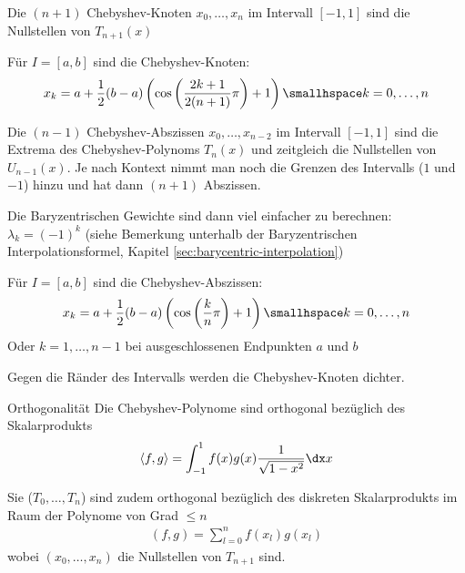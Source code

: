 Die $(n + 1)$ Chebyshev-Knoten $x_0, \ldots, x_n$ im Intervall $[-1, 1]$ sind die Nullstellen von $T_{n + 1}(x)$

 Für $I = [a, b]$ sind die Chebyshev-Knoten:
\rmvspace
\begin{align*}
	x_k = a + \frac{1}{2} (b - a) \left( \cos \left( \frac{2k + 1}{2(n + 1)} \pi \right) + 1 \right) \smallhspace k = 0, \ldots, n
\end{align*}

 Die $(n - 1)$ Chebyshev-Abszissen $x_0, \ldots, x_{n - 2}$ im Intervall $[-1, 1]$ sind die Extrema des Chebyshev-Polynoms $T_n(x)$ und zeitgleich die Nullstellen von $U_{n - 1}(x)$.
Je nach Kontext nimmt man noch die Grenzen des Intervalls ($1$ und $-1$) hinzu und hat dann $(n + 1)$ Abszissen.

Die Baryzentrischen Gewichte sind dann viel einfacher zu berechnen: $\lambda_k = (-1)^k$ (siehe Bemerkung unterhalb der Baryzentrischen Interpolationsformel, Kapitel \ref{sec:barycentric-interpolation})

 Für $I = [a, b]$ sind die Chebyshev-Abszissen:
\rmvspace
\begin{align*}
	x_k = a + \frac{1}{2} (b - a) \left( \cos \left( \frac{k}{n} \pi \right) + 1 \right) \smallhspace k = 0, \ldots, n
\end{align*}
Oder $k = 1, \ldots, n - 1$ bei ausgeschlossenen Endpunkten $a$ und $b$

\inlineremark Gegen die Ränder des Intervalls werden die Chebyshev-Knoten dichter.

\begin{theorem}[]{Orthogonalität}
	Die Chebyshev-Polynome sind orthogonal bezüglich des Skalarprodukts
	\rmvspace
	\begin{align*}
		\langle f, g \rangle = \int_{-1}^{1} f(x) g(x) \frac{1}{\sqrt{1 - x^2}} \dx x
	\end{align*}

	Sie ($T_0, \ldots, T_n$) sind zudem orthogonal bezüglich des diskreten Skalarprodukts im Raum der Polynome von Grad $\leq n$
	\rmvspace
	\begin{align*}
		(f, g) = \sum_{l = 0}^{n} f(x_l)g(x_l)
	\end{align*}
	wobei $(x_0, \ldots, x_n)$ die Nullstellen von $T_{n + 1}$ sind.
\end{theorem}


\newpage
